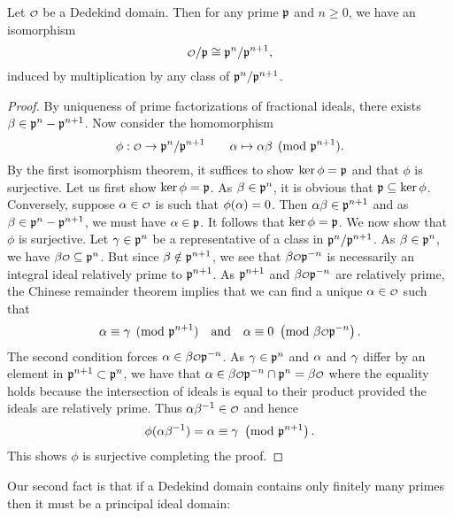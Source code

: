     \begin{proposition}\label{prop:isomorphism_of_quotient_by_prime_integral_ideals}
      Let $\smc{O}$ be a Dedekind domain. Then for any prime $\mathfrak{p}$ and $n \ge 0$, we have an isomorphism
      \[
        \smc{O}/\mf{p} \cong \mf{p}^{n}/\mf{p}^{n+1},
      \]
      induced by multiplication by any class of $\mathfrak{p}^{n}/\mathfrak{p}^{n+1}$.
    \end{proposition}
    \begin{proof}
      By uniqueness of prime factorizations of fractional ideals, there exists $\beta \in \mathfrak{p}^{n}-\mathfrak{p}^{n+1}$. Now consider the homomorphism
      \[
        \phi:\smc{O} \to \mf{p}^{n}/\mf{p}^{n+1} \qquad \a \mapsto \a\b \pmod{\mf{p}^{n+1}}.
      \]
      By the first isomorphism theorem, it suffices to show $\ker\phi = \mathfrak{p}$ and that $\phi$ is surjective. Let us first show $\ker\phi = \mathfrak{p}$. As $\beta \in \mathfrak{p}^{n}$, it is obvious that $\mathfrak{p} \subseteq \ker\phi$. Conversely, suppose $\a \in \smc{O}$ is such that $\phi(\alpha) = 0$. Then $\alpha\beta \in \mathfrak{p}^{n+1}$ and as $\beta \in \mathfrak{p}^{n}-\mathfrak{p}^{n+1}$, we must have $\alpha \in \mathfrak{p}$. It follows that $\ker\phi = \mathfrak{p}$. We now show that $\phi$ is surjective. Let $\gamma \in \mathfrak{p}^{n}$ be a representative of a class in $\mathfrak{p}^{n}/\mathfrak{p}^{n+1}$. As $\beta \in \mathfrak{p}^{n}$, we have $\b\smc{O} \subseteq \mf{p}^{n}$. But since $\beta \notin \mathfrak{p}^{n+1}$, we see that $\b\smc{O}\mf{p}^{-n}$ is necessarily an integral ideal relatively prime to $\mathfrak{p}^{n+1}$. As $\mathfrak{p}^{n+1}$ and $\b\smc{O}\mf{p}^{-n}$ are relatively prime, the Chinese remainder theorem implies that we can find a unique $\a \in \smc{O}$ such that
      \[
        \a \equiv \g \pmod{\mf{p}^{n+1}} \quad \text{and} \quad \a \equiv 0 \tmod{\b\smc{O}\mf{p}^{-n}}.
      \]
      The second condition forces $\a \in \b\smc{O}\mf{p}^{-n}$. As $\gamma \in \mathfrak{p}^{n}$ and $\alpha$ and $\gamma$ differ by an element in $\mathfrak{p}^{n+1} \subset \mathfrak{p}^{n}$, we have that $\a \in \b\smc{O}\mf{p}^{-n} \cap \mf{p}^{n} = \b\smc{O}$ where the equality holds because the intersection of ideals is equal to their product provided the ideals are relatively prime. Thus $\a\b^{-1} \in \smc{O}$ and hence
      \[
        \phi(\alpha\beta^{-1}) = \alpha \equiv \gamma \ \left(\text{mod }\mathfrak{p}^{n+1}\right).
      \]
      This shows $\phi$ is surjective completing the proof.
    \end{proof}

    Our second fact is that if a Dedekind domain contains only finitely many primes then it must be a principal ideal domain:

